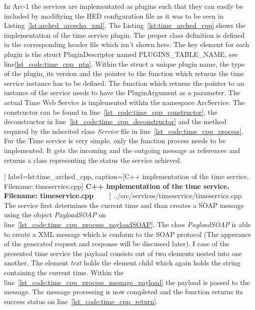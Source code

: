 In Arc-1 the services are implementated as plugins such that they can easily be included by modifiying the HED configuration file as it was to be seen in Listing~\ref{lst:arched_arcecho_xml}.
The Listing~\ref{lst:time_arched_cpp}.shows the implementation of the time service plugin.
The proper class definition is defined in the corresponding header file which isn't shown here.
The key element for each plugin is the struct PluginDescriptor named PLUGINS\_TABLE\_NAME, see line\ref{lst_code:time_cpp_ptn}. 
Within the struct a unique plugin name, the type of the plugin, its version and the pointer to the function which returns the time service instance has to be defined.
The function which returns the pointer to an instance of the service needs to have the PluginArgument as a parameter. 
The actual Time Web Service is implemented within the namespace ArcService. The constructor can be found in line~\ref{lst_code:time_cpp_constructor}, the deconstructor in line~\ref{lst_code:time_cpp_deconstructor} and the method required by the inherited class \textit{Service} file in line~\ref{lst_code:time_cpp_process}. For the Time service is very simple, only the function process needs to be implemented. It gets the incoming and the outgoing message as references and returns a class representing the status the service achieved. 

	[
	label=lst:time_arched_cpp,
	caption={[C++ implementation of the time service. Filename: timeservice.cpp]
	\textbf{C++ implementation of the time service. Filename: timeservice.cpp\textcolor{white}{hmf}}}
	]
{../src/services/timeservice/timeservice.cpp}
The service first determines the current time and than creates a SOAP message using the object \textit{PayloadSOAP} on line~\ref{lst_code:time_cpp_process_payloadSOAP}. The class \textit{PayloadSOAP} is able to create a XML message which is conform to the SOAP protocol (The apperance of the generated request and response will be discussed later). I case of the presented time service the payload consists out of two elements nested into one another. The element \textit{text} holds the element child which again holds the string containing the current time.
Within the line~\ref{lst_code:time_cpp_process_message_payload} the payload is passed to the message. 
The message processing is now completed and the function returns its success status on line~\ref{lst_code:time_cpp_return}.\\


